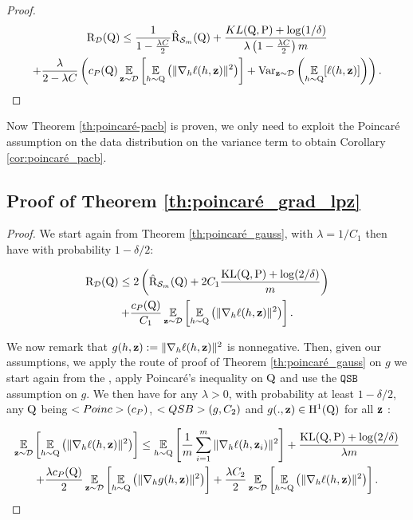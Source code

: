 \begin{noaddcontents}
\begin{proof}
        \begin{multline*}
          \text{R}_{\mathcal{D}}(\mathrm{Q}) \leq \frac{1}{1-\frac{\lambda C}{2}} \hat{\text{R}}_{\mathcal{S}_m}(\mathrm{Q}) + \frac{KL(\mathrm{Q},\mathrm{P}) +\log(1/\delta)}{\lambda \left( 1-\frac{\lambda C}{2}\right) m} \\
          + \frac{\lambda}{2-\lambda C}\left( c_{P}(\mathrm{Q})\operatorname*{\mathbb{E}}_{\mathbf{z}\sim\mathcal{D}} \left[ \operatorname*{\mathbb{E}}_{h\sim \mathrm{Q}}\left( \|\nabla_h \ell(h,\mathbf{z})\|^2 \right) \right]  + \mathrm{Var}_{\mathbf{z}\sim\mathcal{D}} \left( \operatorname*{\mathbb{E}}_{h\sim\mathrm{Q}}[\ell(h,\mathbf{z})] \right)  \right).
        \end{multline*}
    
      \end{proof}
    
      Now Theorem \ref{th:poincaré-pacb} is proven, we only need to exploit the Poincaré assumption on the data distribution on the variance term to obtain Corollary \ref{cor:poincaré_pacb}.
    
    \subsection{Proof of Theorem \ref{th:poincaré_grad_lpz}}
    \label{sec: proof_poincaré_grad}
    \begin{proof}
      We start again from Theorem \ref{th:poincaré_gauss}, with $\lambda= 1/C_1$ then have with probability $1-\delta/2$:
    
      \begin{multline}
        \label{eq: fast_rate_grad_lpz_1}
        \text{R}_{\mathcal{D}}(\mathrm{Q}) \leq 2 \left( \hat{\text{R}}_{\mathcal{S}_m}(\mathrm{Q}) + 2C_1\frac{\mathrm{KL}(\mathrm{Q},\mathrm{P}) +\log(2/\delta)}{ m} \right) \\+ \frac{c_P(\mathrm{Q})}{C_1}\operatorname*{\mathbb{E}}_{\mathbf{z}\sim\mathcal{D}} \left[ \operatorname*{\mathbb{E}}_{h\sim \mathrm{Q}}\left( \|\nabla_h \ell(h,\mathbf{z})\|^2 \right) \right] .
      \end{multline}
    
      We now remark that $g(h,\mathbf{z}):= \|\nabla_h \ell(h,\mathbf{z})\|^2$ is nonnegative.
       Then, given our assumptions, we apply the route of proof of Theorem \ref{th:poincaré_gauss} on $g$ \ie we start again from the \citep[Corollary 17]{chugg2023unified}, apply Poincaré's inequality on $\mathrm{Q}$ and use the $\texttt{QSB}$ assumption on $g$. We then have for any $\lambda >0$, with probability at least $1-\delta/2$, any $\mathrm{Q}$ being $<Poinc>(c_P)$, $<QSB>\left( g,C_2\right)$ and $g(.,\mathbf{z})\in \mathrm{H}^{1}(\mathrm{Q})$ for all $\mathbf{z}$ :
    
       \begin{multline}
        \label{eq: fast_rate_grad_lpz_2}
        \operatorname*{\mathbb{E}}_{\mathbf{z}\sim\mathcal{D}} \left[ \operatorname*{\mathbb{E}}_{h\sim \mathrm{Q}}\left( \|\nabla_h \ell(h,\mathbf{z})\|^2 \right) \right] \leq \operatorname*{\mathbb{E}}_{h\sim \mathrm{Q}}\left[ \frac{1}{m}\sum_{i=1}^m \|\nabla_h\ell(h,\mathbf{z}_i)\|^2 \right]  + \frac{\mathrm{KL}(\mathrm{Q},\mathrm{P}) +\log(2/\delta)}{\lambda m} \\
        + \frac{\lambda c_P(\mathrm{Q})}{2}\operatorname*{\mathbb{E}}_{\mathbf{z}\sim\mathcal{D}} \left[ \operatorname*{\mathbb{E}}_{h\sim \mathrm{Q}}\left( \|\nabla_h g(h,\mathbf{z})\|^2 \right) \right] + \frac{\lambda C_2}{2}  \operatorname*{\mathbb{E}}_{\mathbf{z}\sim\mathcal{D}} \left[ \operatorname*{\mathbb{E}}_{h\sim \mathrm{Q}}\left( \|\nabla_h \ell(h,\mathbf{z})\|^2 \right) \right].
      \end{multline}
    

\end{proof}
\end{noaddcontents}
